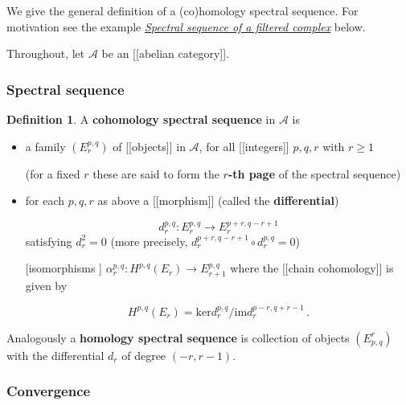 \documentclass[12pt,titlepage]{article}
\theoremstyle{plain}
\theoremstyle{definition}
\newtheorem{defn}{Definition}
\theoremstyle{remark}
\begin{document}
We give the general definition of a (co)homology spectral sequence. For motivation see the example \emph{\hyperlink{SpectralSequenceOfFilteredComplex}{Spectral sequence of a filtered complex}} below.

Throughout, let $\mathcal{A}$ be an [[abelian category]].

\hypertarget{spectral_sequence}{}\subsubsection*{{Spectral sequence}}\label{spectral_sequence}

\begin{defn}
\label{cohomology_spectral_sequence}\hypertarget{}{}
A \textbf{cohomology spectral sequence} in $\mathcal{A}$ is

\begin{itemize}%
\item a family $(E^{p,q}_r)$ of [[objects]] in $\mathcal{A}$, for all [[integers]] $p,q,r$ with $r\geq 1$

(for a fixed $r$ these are said to form the \textbf{$r$-th page} of the spectral sequence)


\item for each $p,q,r$ as above a [[morphism]] (called the \textbf{differential})

\begin{displaymath}
d^{p,q}_r:E^{p,q}_r\to E^{p+r,q-r+1}_r
\end{displaymath}
satisfying $d_r^2 = 0$ (more precisely, $d_r^{p+r,q-r+1}\circ d_r^{p,q} = 0$)


\item [[isomorphisms]] $\alpha_r^{p,q}: H^{p,q}(E_r)\to E^{p,q}_{r+1}$ where the [[chain cohomology]] is given by

\begin{displaymath}
H^{p,q}(E_r) = \mathrm{ker} d^{p,q}_r/ \mathrm{im} d^{p-r,q+r-1}_r
 \,.
\end{displaymath}


\end{itemize}
\end{defn}
Analogously a \textbf{homology spectral sequence} is collection of objects $(E_{p,q}^r)$ with the differential $d_r$ of degree $(-r,r-1)$.

\hypertarget{ConvergenceOfSpectralSequences}{}\subsubsection*{{Convergence}}\label{ConvergenceOfSpectralSequences}
\end{document}
